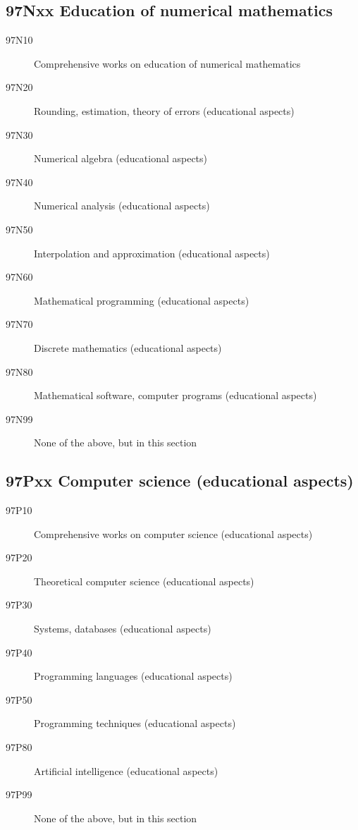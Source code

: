 \subsection*{97Nxx  Education of numerical mathematics }\label{97Nxx}
\begin{description}  
\item [97N10]\label{97N10} Comprehensive works on education of numerical mathematics
\item [97N20]\label{97N20} Rounding, estimation, theory of errors (educational aspects)
\item [97N30]\label{97N30} Numerical algebra (educational aspects)
\item [97N40]\label{97N40} Numerical analysis (educational aspects)
\item [97N50]\label{97N50} Interpolation and approximation (educational aspects)
\item [97N60]\label{97N60} Mathematical programming (educational aspects)
\item [97N70]\label{97N70} Discrete mathematics (educational aspects)
\item [97N80]\label{97N80} Mathematical software, computer programs (educational aspects)
\item [97N99]\label{97N99} None of the above, but in this section
\end{description}
\subsection*{97Pxx  Computer science (educational aspects) }\label{97Pxx}
\begin{description}  
\item [97P10]\label{97P10} Comprehensive works on computer science (educational aspects)
\item [97P20]\label{97P20} Theoretical computer science (educational aspects)
\item [97P30]\label{97P30} Systems, databases (educational aspects)
\item [97P40]\label{97P40} Programming languages (educational aspects)
\item [97P50]\label{97P50} Programming techniques (educational aspects)
\item [97P80]\label{97P80} Artificial intelligence (educational aspects)
\item [97P99]\label{97P99} None of the above, but in this section
\end{description}
